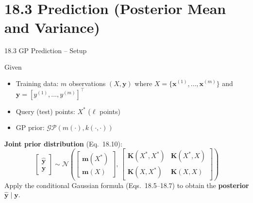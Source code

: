 \documentclass[aspectratio=169,10pt]{beamer}
\newcommand{\bx}{\mathbf{x}}
\newcommand{\Norm}{\mathcal{N}}
\newcommand{\GP}{\mathcal{GP}}
\begin{document}
\section{18.3 Prediction (Posterior Mean and Variance)}

\begin{frame}{18.3 GP Prediction -- Setup}
  \begin{block}{Given}
    \begin{itemize}
      \item Training data: $m$ observations $(X, \mathbf{y})$ where
            $X = \{\bx^{(1)},\ldots,\bx^{(m)}\}$ and
            $\mathbf{y} = [y^{(1)},\ldots,y^{(m)}]^\top$
      \item Query (test) points: $X^*$ ($\ell$ points)
      \item GP prior: $\GP(m(\cdot), k(\cdot,\cdot))$
    \end{itemize}
  \end{block}
  \vspace{0.3em}
  \textbf{Joint prior distribution} (Eq.\ 18.10):
  \[
    \begin{bmatrix}\hat{\mathbf{y}}\\\mathbf{y}\end{bmatrix}
    \sim \Norm\!\left(
      \begin{bmatrix}\mathbf{m}(X^*)\\\mathbf{m}(X)\end{bmatrix},\,
      \begin{bmatrix}
        \mathbf{K}(X^*,X^*) & \mathbf{K}(X^*,X) \\
        \mathbf{K}(X,X^*)   & \mathbf{K}(X,X)
      \end{bmatrix}
    \right)
  \]
  \vspace{0.3em}
  Apply the conditional Gaussian formula (Eqs.\ 18.5--18.7) to obtain the
  \textbf{posterior} $\hat{\mathbf{y}} \mid \mathbf{y}$.
\end{frame}
\end{document}
